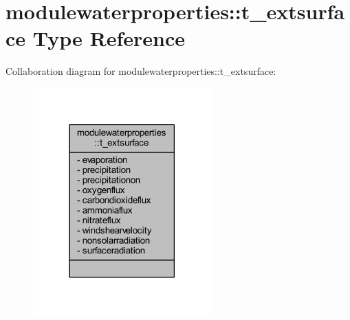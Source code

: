 \hypertarget{structmodulewaterproperties_1_1t__extsurface}{}\section{modulewaterproperties\+:\+:t\+\_\+extsurface Type Reference}
\label{structmodulewaterproperties_1_1t__extsurface}


Collaboration diagram for modulewaterproperties\+:\+:t\+\_\+extsurface\+:\nopagebreak
\begin{figure}[H]
\begin{center}
\leavevmode
\includegraphics[width=194pt]{structmodulewaterproperties_1_1t__extsurface__coll__graph}
\end{center}
\end{figure}
